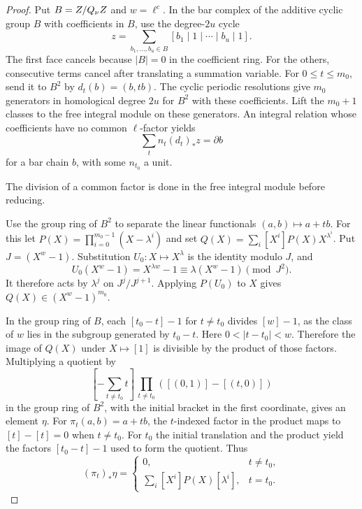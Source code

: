 \begin{proof}

Put \(B=Z/Q_\nu Z\) and \(w=\ell^c\). In the bar complex
of the additive cyclic group \(B\) with coefficients
in \(B\), use the degree-\(2u\) cycle
\[
           z=\sum_{b_1,\ldots,b_u\in B}
                      [b_1\mid1\mid\cdots\mid b_u\mid1].
\]
The first face cancels because \(|B|=0\) in the
coefficient ring. For the others, consecutive terms
cancel after translating a summation variable.
For \(0\le t\le m_0\), send it to \(B^2\) by
\(d_t(b)=(b,tb)\). The cyclic periodic resolutions give
\(m_0\) generators in homological degree \(2u\) for
\(B^2\) with these coefficients. Lift the \(m_0+1\)
classes to the free integral module on these generators.
An integral relation whose coefficients have no common
\(\ell\)-factor yields
\[
             \sum_t n_t(d_t)_* z=\partial b
\]
for a bar chain \(b\), with some \(n_{t_0}\) a unit.

The division of a common factor is done in the free
integral module before reducing.

Use the group ring of \(B^2\) to separate the linear
functionals \((a,b)\mapsto a+tb\). For this let
\(P(X)=\prod_{i=0}^{m_0-1}(X-\lambda^i)\) and set
\(Q(X)=\sum_i [X^i]P(X)X^{\lambda^i}\).
Put \(J=(X^w-1)\). Substitution \(U_0:X\mapsto X^\lambda\)
is the identity modulo \(J\), and
\[
   U_0(X^w-1)=X^{\lambda w}-1\equiv\lambda(X^w-1)\pmod{J^2}.
\]
It therefore acts by \(\lambda^j\) on \(J^j/J^{j+1}\).
Applying \(P(U_0)\) to \(X\) gives
\(Q(X)\in(X^w-1)^{m_0}\).

In the group ring of \(B\),
each \([t_0-t]-1\) for \(t\ne t_0\) divides
\([w]-1\), as the class of \(w\) lies in the subgroup
generated by \(t_0-t\). Here \(0<|t-t_0|<w\).
Therefore the image of \(Q(X)\) under \(X\mapsto[1]\)
is divisible by the product of those factors.
Multiplying a quotient by
\[
       [-\textstyle\sum_{t\ne t_0}t]\,
            \prod_{t\ne t_0} ([(0,1)]-[(t,0)])
\]
in the group ring of \(B^2\), with the initial bracket in
the first coordinate, gives an element \(\eta\).
For \(\pi_t(a,b)=a+tb\), the \(t\)-indexed factor in the
product maps to \([t]-[t]=0\) when \(t\ne t_0\).
For \(t_0\) the initial translation and the product yield the
factors \([t_0-t]-1\) used to form the quotient. Thus
\[
       (\pi_t)_*\eta =
        \begin{cases}
        0,&t\ne t_0,\\
        \sum_i[X^i]P(X)[\lambda^i],&t=t_0 .
        \end{cases}
\]


\end{proof}
